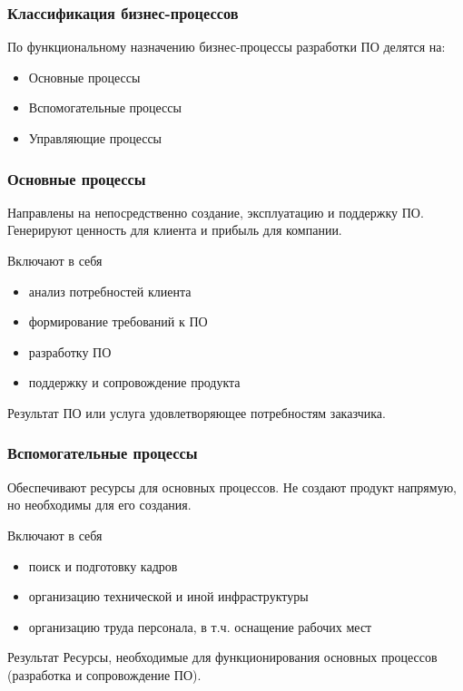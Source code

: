 \documentclass{../industrial-development}
\begin{document}
\begin{frame} \frametitle{Классификация бизнес-процессов}
	По функциональному назначению бизнес-процессы разработки ПО делятся на:
	\begin{itemize}
		\item \alert{Основные} процессы
		\item \alert{Вспомогательные} процессы
		\item \alert{Управляющие} процессы
	\end{itemize}
\end{frame}
\lecturenotes


\begin{frame} \frametitle{Основные процессы}
	Направлены на непосредственно создание, эксплуатацию и поддержку ПО. Генерируют ценность для клиента и прибыль для компании.
	
	\begin{block}{Включают в себя}
		\begin{itemize}
			\item анализ потребностей клиента
			\item формирование требований к ПО
			\item разработку ПО
			\item поддержку и сопровождение продукта
		\end{itemize}
	\end{block}
	\begin{block}{Результат}
		ПО или услуга удовлетворяющее потребностям заказчика.
	\end{block}
\end{frame}
\lecturenotes


\begin{frame} \frametitle{Вспомогательные процессы}
	Обеспечивают ресурсы для основных процессов. Не создают продукт напрямую, но необходимы для его создания.

	\begin{block}{Включают в себя}
		\begin{itemize}
			\item поиск и подготовку кадров
			\item организацию технической и иной инфраструктуры
			\item организацию труда персонала, в т.ч. оснащение рабочих мест
		\end{itemize}
	\end{block}
	\begin{block}{Результат}
		Ресурсы, необходимые для функционирования основных процессов (разработка и сопровождение ПО).
	\end{block}
\end{frame}
\lecturenotes
\end{document}
